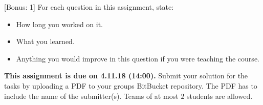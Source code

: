 \documentclass{exam}
\newcommand{\duedate}{4.11.18 (14:00)}
\newcommand{\due}{{\bf This assignment is due on \duedate.} }
\begin{document}
\begin{questions}
		[Bonus: 1]
		For each question in this assignment, state:
		\begin{itemize}
			\item How long you worked on it.
			\item What you learned.
			\item Anything you would improve in this question if you were teaching the course.
		\end{itemize}
	\end{questions}
	
	\noindent
	\due Submit your solution for the tasks by uploading a PDF to your groups BitBucket repository. The PDF has to include the name of the submitter(s). Teams of at most $2$ students are allowed.
\end{document}
